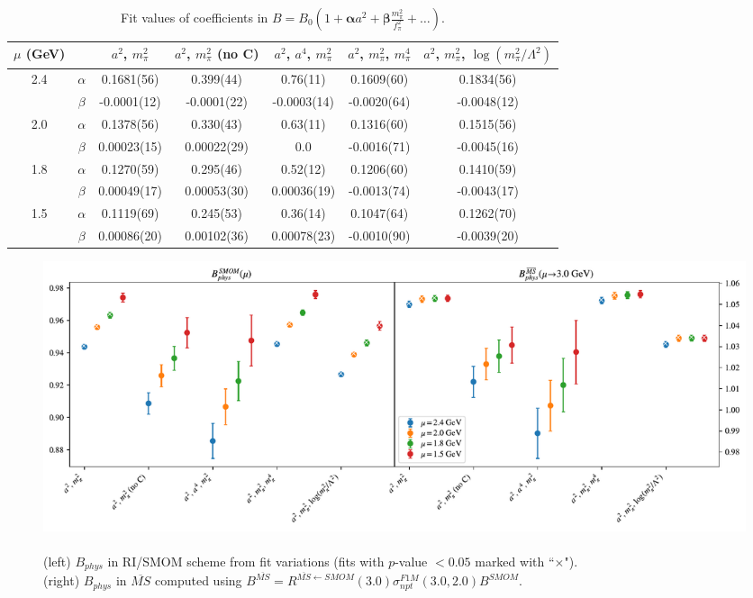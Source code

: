 \documentclass[12pt]{extarticle}
\begin{document}
\begin{table}[h!]
\begin{center}
\begin{tabular}{|c c|c|c|c|c|c|}
\hline
$\mu$ (GeV) &  & $a^2$, $m_\pi^2$& $a^2$, $m_\pi^2$ (no C)& $a^2$, $a^4$, $m_\pi^2$& $a^2$, $m_\pi^2$, $m_\pi^4$& $a^2$, $m_\pi^2$, $\log(m_\pi^2/\Lambda^2)$\\
\hline
\multirow{2}{0.5in}{2.4} & $\alpha$ & 0.1681(56)& 0.399(44)& 0.76(11)& 0.1609(60)& 0.1834(56)\\
 & $\beta$ & -0.0001(12)& -0.0001(22)& -0.0003(14)& -0.0020(64)& -0.0048(12)\\
\hline
\multirow{2}{0.5in}{2.0} & $\alpha$ & 0.1378(56)& 0.330(43)& 0.63(11)& 0.1316(60)& 0.1515(56)\\
 & $\beta$ & 0.00023(15)& 0.00022(29)& 0.0& -0.0016(71)& -0.0045(16)\\
\hline
\multirow{2}{0.5in}{1.8} & $\alpha$ & 0.1270(59)& 0.295(46)& 0.52(12)& 0.1206(60)& 0.1410(59)\\
 & $\beta$ & 0.00049(17)& 0.00053(30)& 0.00036(19)& -0.0013(74)& -0.0043(17)\\
\hline
\multirow{2}{0.5in}{1.5} & $\alpha$ & 0.1119(69)& 0.245(53)& 0.36(14)& 0.1047(64)& 0.1262(70)\\
 & $\beta$ & 0.00086(20)& 0.00102(36)& 0.00078(23)& -0.0010(90)& -0.0039(20)\\
\hline
\end{tabular}
\caption{Fit values of coefficients in $B = B_0(1 + \mathbf{\alpha} a^2 + \mathbf{\beta} \frac{m_\pi^2}{f_\pi^2} + \ldots)$.}
\end{center}
\end{table}
\begin{figure}
\centering
\includegraphics[page=1, width=1.1\textwidth]{plots/SSmPP_fit_summary.pdf}
\caption{\\(left) $B_{phys}$ in RI/SMOM scheme from fit variations (fits with $p$-value $<0.05$ marked with ``$\times$"). \\(right) $B_{phys}$ in $\overline{MS}$ computed using $B^{\overline{MS}} = R^{\overline{MS}\leftarrow SMOM}(3.0)\sigma_{npt}^{F1M}(3.0, 2.0) B^{SMOM}$.}
\end{figure}
\end{document}

